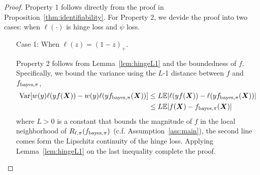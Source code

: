 \documentclass[11pt]{article}
\theoremstyle{plain}
\theoremstyle{definition}
\def\bayespif{f_{\textup{bayes},\pi}}
\begin{document}
\begin{proof}
Property 1 follows directly from the proof in Proposition~\ref{thm:identifiability}.
For Property 2, we devide the proof into two cases: when $\ell(\cdot)$ is hinge loss and  $\psi$ loss. 

\begin{enumerate}[label={2.\arabic*},wide, labelwidth=!, labelindent=0pt]
\item[Case 1:] When $\ell(z) = (1-z)_+$.

Property 2 follows from Lemma~\ref{lem:hingeL1} and the boundedness of $f$. Specifically, we bound the variance using the $L$-1 distance between $f$ and $\bayespif$, 
\begin{align}
\text{Var}[w(y)\ell(yf(\mX))-w(y)\ell(y\bayespif(\mX))]&\leq  L\mathbb{E}|\ell(yf(\mX))-\ell(y\bayespif(\mX))|\\
&\leq L\mathbb{E}|f(\mX)-\bayespif(\mX)|
\end{align}
where $L>0$ is a constant that bounds the magnitude of $f$ in the local neighborhood of $R_{\ell,\pi}(\bayespif)$ (c.f. Assumption~\ref{ass:main}), the second line comes form the Lipschitz continuity of the hinge loss.  Applying  Lemma~\ref{lem:hingeL1} on the last inequality complete the proof.


\end{enumerate}
\end{proof}
\end{document}
